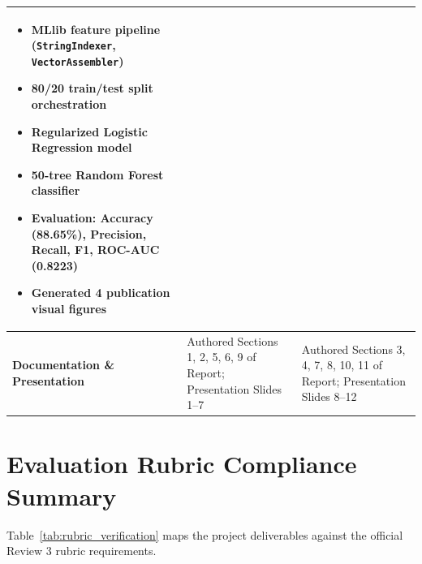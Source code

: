 \documentclass[11pt,a4paper]{article}
\begin{document}
\begin{table}[H]
\begin{tabular}{p{3.2cm}p{5.8cm}p{5.8cm}}
\begin{itemize}[leftmargin=*,noitemsep,topsep=0pt]
            \item MLlib feature pipeline (\texttt{StringIndexer}, \texttt{VectorAssembler})
            \item 80/20 train/test split orchestration
            \item Regularized Logistic Regression model
            \item 50-tree Random Forest classifier
            \item Evaluation: Accuracy (88.65\%), Precision, Recall, F1, ROC-AUC (0.8223)
            \item Generated 4 publication visual figures
        \end{itemize} \\
        \midrule
        \textbf{Documentation \& Presentation} & 
        Authored Sections 1, 2, 5, 6, 9 of Report; Presentation Slides 1--7 & 
        Authored Sections 3, 4, 7, 8, 10, 11 of Report; Presentation Slides 8--12 \\
        \bottomrule
    \end{tabular}
\end{table}

\section{Evaluation Rubric Compliance Summary}
Table~\ref{tab:rubric_verification} maps the project deliverables against the official Review 3 rubric requirements.
\end{document}
